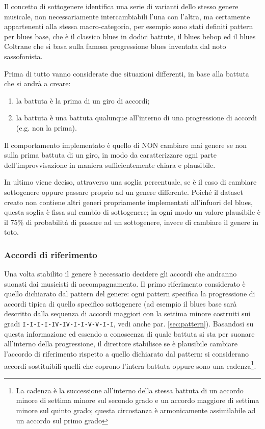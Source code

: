Il concetto di sottogenere identifica una serie di varianti dello stesso genere musicale, non necessariamente intercambiabili l'una con l'altra, ma certamente appartenenti alla stessa macro-categoria, per esempio sono stati definiti pattern per blues base, che è il classico blues in dodici battute, il blues bebop ed il blues Coltrane che si basa sulla famosa progressione blues inventata dal noto sassofonista.

Prima di tutto vanno considerate due situazioni differenti, in base alla battuta che si andrà a creare:
\begin{enumerate}
\item la battuta è la prima di un giro di accordi;
\item la battuta è una battuta qualunque all'interno di una progressione di accordi (e.g. non la prima).
\end{enumerate}

Il comportamento implementato è quello di NON cambiare mai genere se non sulla prima battuta di un giro, in modo da caratterizzare ogni parte dell'improvvisazione in maniera sufficientemente chiara e plausibile. 

In ultimo viene deciso, attraverso una soglia percentuale, se è il caso di cambiare sottogenere oppure passare proprio ad un genere differente.
Poiché il dataset creato non contiene altri generi propriamente implementati all'infuori del blues, questa soglia è fissa sul cambio di sottogenere; in ogni modo un valore plausibile è il 75\% di probabilità di passare ad un sottogenere, invece di cambiare il genere in toto.

\subsubsection{Accordi di riferimento}
Una volta stabilito il genere è necessario decidere gli accordi che andranno suonati dai musicisti di accompagnamento.
Il primo riferimento considerato è quello dichiarato dal pattern del genere: ogni pattern specifica la progressione di accordi tipica di quello specifico sottogenere (ad esempio il blues base sarà descritto dalla sequenza di accordi maggiori con la settima minore costruiti sui gradi \texttt{I-I-I-I-IV-IV-I-I-V-V-I-I}, vedi anche par. \ref{sec:pattern}).
Basandosi su questa informazione ed essendo a conoscenza di quale battuta si sta per suonare all'interno della progressione, il direttore stabilisce se è plausibile cambiare l'accordo di riferimento rispetto a quello dichiarato dal pattern: si considerano accordi sostituibili quelli che coprono l'intera battuta oppure sono una cadenza\footnote{La cadenza è la successione all'interno della stessa battuta di un accordo minore di settima minore sul secondo grado e un accordo maggiore di settima minore sul quinto grado; questa circostanza è armonicamente assimilabile ad un accordo sul primo grado}.

